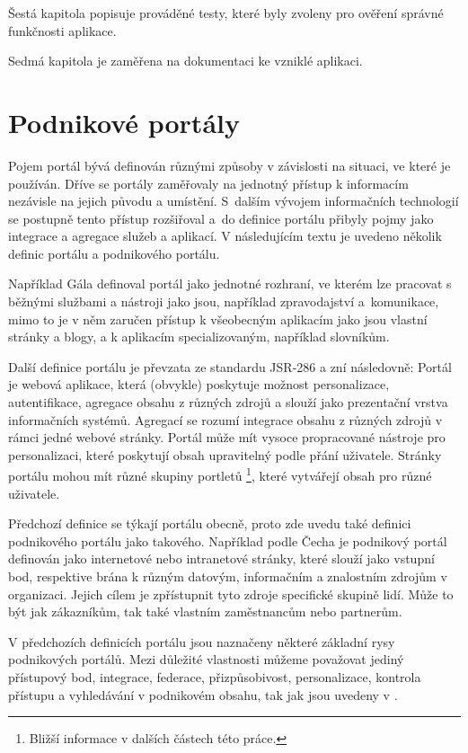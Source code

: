 \documentclass{fithesis}
\begin{document}
Šestá kapitola popisuje prováděné testy, které byly zvoleny pro ověření správné funkčnosti aplikace. 

Sedmá kapitola je zaměřena na dokumentaci ke vzniklé aplikaci.







\chapter{Podnikové portály}
Pojem portál bývá definován různými způsoby v závislosti na situaci, ve které je používán. Dříve se portály zaměřovaly na jednotný přístup k informacím nezávisle na jejich původu a umístění. S~dalším vývojem informačních technologií se postupně tento přístup rozšiřoval a~do definice portálu přibyly pojmy jako integrace a agregace služeb a aplikací. V následujícím textu je uvedeno několik definic portálu a podnikového portálu.

Například Gála definoval portál jako jednotné rozhraní, ve kterém lze pracovat s běžnými službami a nástroji jako jsou, například zpravodajství a~komunikace, mimo to je v něm zaručen přístup k všeobecným aplikacím jako jsou vlastní stránky a blogy, a k aplikacím specializovaným, například slovníkům. \cite{gala}

Další definice portálu je převzata ze standardu JSR-286 a zní následovně: Portál je webová aplikace, která (obvykle) poskytuje možnost personalizace, autentifikace, agregace obsahu z různých zdrojů a slouží jako prezentační vrstva informačních systémů. Agregací se rozumí integrace obsahu z různých zdrojů v rámci jedné webové stránky. Portál může mít vysoce propracované nástroje pro personalizaci, které poskytují obsah upravitelný podle přání uživatele. Stránky portálu mohou mít různé skupiny portletů \footnote[1]{Bližší informace v dalších částech této práce.}, které vytvářejí obsah pro různé uživatele.  \cite{jsr-286}

Předchozí definice se týkají portálu obecně, proto zde uvedu také definici podnikového portálu jako takového. Například podle Čecha je podnikový portál definován jako internetové nebo intranetové stránky, které slouží jako vstupní bod, respektive brána k různým datovým, informačním a znalostním zdrojům v organizaci. Jejich cílem je zpřístupnit tyto zdroje specifické skupině lidí. Může to být jak zákazníkům, tak také vlastním zaměstnancům nebo partnerům. \cite{cech}

V předchozích definicích portálu jsou naznačeny některé základní rysy podnikových portálů. Mezi důležité vlastnosti můžeme považovat jediný přístupový bod, integrace, federace, přizpůsobivost, personalizace, kontrola přístupu a vyhledávání v podnikovém obsahu, tak jak jsou uvedeny v \cite{enterprise-portal}.
\end{document}
